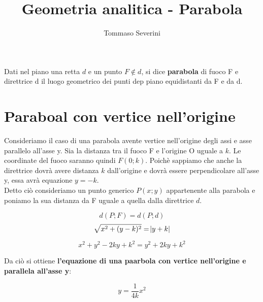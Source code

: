 \documentclass[10pt,a4paper]{article}
\author{Tommaso Severini}
\title{Geometria analitica - Parabola}
\begin{document}
	\maketitle


\begin{definition}[Parabola]
  Dati nel piano una retta $d$ e un punto $F \notin d$, si dice \textbf{parabola} di fuoco F e direttrice d il luogo geometrico dei punti dep piano equidistanti da F e da d.
\end{definition}

\section{Paraboal con vertice nell'origine}

Consideriamo il caso di una parabola avente vertice nell'origine degli assi e asse parallelo all'asse y. Sia la distanza tra il fuoco F e l'origine O uguale a $k$. Le coordinate del fuoco saranno quindi $F(0; k)$. Poichè sappiamo che anche la direttrice dovrà avere distanza $k$ dall'origine e dovrà essere perpendicolare all'asse y, essa avrà equazione $y=-k$.\\

Detto ciò consideriamo un punto generico $P(x; y)$ appartenente alla parabola e poniamo la sua distanza da F uguale a quella dalla direttrice $d$.

\begin{equation}
  d(P;F) = d(P;d)
\end{equation}
\begin{equation}
  \sqrt{x^2+(y-k)^2}=\abs{y+k}
\end{equation}

\begin{equation}
  x^2+y^2-2ky+k^2= y^2+2ky+k^2
\end{equation}

Da ciò si ottiene \textbf{l'equazione di una paarbola con vertice nell'origine e parallela all'asse y}:

\begin{equation}
    y= \frac{1}{4k}x^2
\end{equation}
\end{document}
